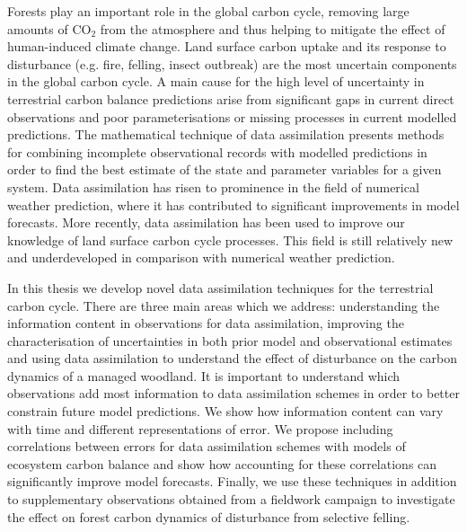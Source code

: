 Forests play an important role in the global carbon cycle, removing large amounts of CO\(_2\) from the atmosphere and thus helping to mitigate the effect of human-induced climate change. Land surface carbon uptake and its response to disturbance (e.g. fire, felling, insect outbreak) are the most uncertain components in the global carbon cycle. A main cause for the high level of uncertainty in terrestrial carbon balance predictions arise from significant gaps in current direct observations and poor parameterisations or missing processes in current modelled predictions. The mathematical technique of data assimilation presents methods for combining incomplete observational records with modelled predictions in order to find the best estimate of the state and parameter variables for a given system. Data assimilation has risen to prominence in the field of numerical weather prediction, where it has contributed to significant improvements in model forecasts. More recently, data assimilation has been used to improve our knowledge of land surface carbon cycle processes. This field is still relatively new and underdeveloped in comparison with numerical weather prediction.

In this thesis we develop novel data assimilation techniques for the terrestrial carbon cycle. There are three main areas which we address: understanding the information content in observations for data assimilation, improving the characterisation of uncertainties in both prior model and observational estimates and using data assimilation to understand the effect of disturbance on the carbon dynamics of a managed woodland. It is important to understand which observations add most information to data assimilation schemes in order to better constrain future model predictions. We show how information content can vary with time and different representations of error. We propose including correlations between errors for data assimilation schemes with models of ecosystem carbon balance and show how accounting for these correlations can significantly improve model forecasts. Finally, we use these techniques in addition to supplementary observations obtained from a fieldwork campaign to investigate the effect on forest carbon dynamics of disturbance from selective felling.     

